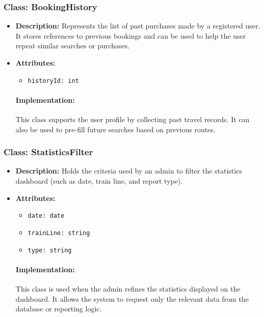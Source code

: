 \documentclass{article}
\begin{document}
\subsubsection*{Class: BookingHistory}
\begin{itemize}
    \item \textbf{Description:} Represents the list of past purchases made by a registered user. It stores references to previous bookings and can be used to help the user repeat similar searches or purchases.
    \item \textbf{Attributes:}
    \begin{itemize}
        \item \texttt{historyId: int}
    \end{itemize}
\paragraph{Implementation:} This class supports the user profile by collecting past travel records. It can also be used to pre-fill future searches based on previous routes.
\end{itemize}

\subsubsection*{Class: StatisticsFilter}
\begin{itemize}
    \item \textbf{Description:} Holds the criteria used by an admin to filter the statistics dashboard (such as date, train line, and report type).
    \item \textbf{Attributes:}
    \begin{itemize}
        \item \texttt{date: date}
        \item \texttt{trainLine: string}
        \item \texttt{type: string}
    \end{itemize}
\paragraph{Implementation:} This class is used when the admin refines the statistics displayed on the dashboard. It allows the system to request only the relevant data from the database or reporting logic.
\end{itemize}
\end{document}
